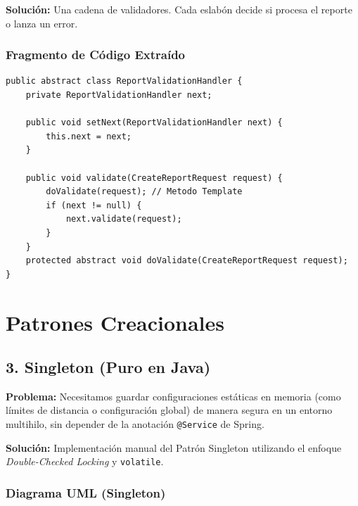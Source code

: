 \documentclass[11pt,a4paper]{article}
\begin{document}
\textbf{Solución:} Una cadena de validadores. Cada eslabón decide si procesa el reporte o lanza un error.

\subsubsection*{Fragmento de Código Extraído}
\begin{lstlisting}[caption={Implementación Base del Validador}]
public abstract class ReportValidationHandler {
    private ReportValidationHandler next;

    public void setNext(ReportValidationHandler next) {
        this.next = next;
    }

    public void validate(CreateReportRequest request) {
        doValidate(request); // Metodo Template
        if (next != null) {
            next.validate(request);
        }
    }
    protected abstract void doValidate(CreateReportRequest request);
}
\end{lstlisting}

\newpage

\section{Patrones Creacionales}

\subsection{3. Singleton (Puro en Java)}
\textbf{Problema:} Necesitamos guardar configuraciones estáticas en memoria (como límites de distancia o configuración global) de manera segura en un entorno multihilo, sin depender de la anotación \texttt{@Service} de Spring.

\textbf{Solución:} Implementación manual del Patrón Singleton utilizando el enfoque \textit{Double-Checked Locking} y \texttt{volatile}.

\subsubsection*{Diagrama UML (Singleton)}
\begin{center}
\end{center}
\end{document}
